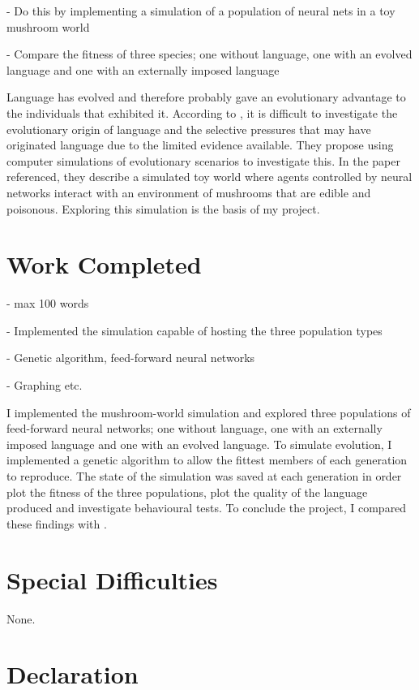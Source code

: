 \documentclass[12pt,a4paper,twoside,openright]{report}
\begin{document}
- Do this by implementing a simulation of a population of neural nets in a toy mushroom world

- Compare the fitness of three species; one without language, one with an evolved language and one with an externally imposed language 


Language has evolved and therefore probably gave an evolutionary advantage to the individuals that exhibited it. According to \citet{Cangelosi1998}, it is difficult to investigate the evolutionary origin of language and the selective pressures that may have originated language due to the limited evidence available. They propose using computer simulations of evolutionary scenarios to investigate this. In the paper referenced, they describe a simulated toy world where agents controlled by neural networks interact with an environment of mushrooms that are edible and poisonous. Exploring this simulation is the basis of my project.

\section*{Work Completed}

- max 100 words

- Implemented the simulation capable of hosting the three population types

- Genetic algorithm, feed-forward neural networks

- Graphing etc.


I implemented the mushroom-world simulation and explored three populations of feed-forward neural networks; one without language, one with an externally imposed language and one with an evolved language. To simulate evolution, I implemented a genetic algorithm to allow the fittest members of each generation to reproduce. The state of the simulation was saved at each generation in order plot the fitness of the three populations, plot the quality of the language produced and investigate behavioural tests. To conclude the project, I compared these findings with \citet{Cangelosi1998}.

\section*{Special Difficulties}

None.
 
\newpage
\section*{Declaration}
\end{document}
